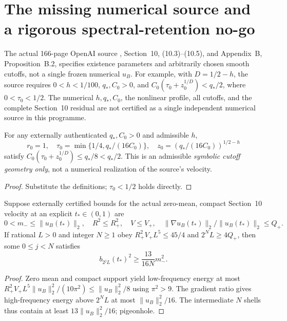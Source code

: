 
\section{The missing numerical source and a rigorous spectral-retention no-go}
\label{sec:xxxii-source-retention}
The actual 166-page OpenAI source \cite{openai2026}, Section~10,
(10.3)--(10.5), and Appendix~B, Proposition~B.2, specifies
existence parameters and arbitrarily chosen smooth cutoffs,
not a single frozen numerical $u_B$. For example, with
$D=1/2-h$, the source requires
$0<h<1/100$, $q_*,C_0>0$, and
$C_0(\tau_0+z_0^{1/D})<q_*/2$, where $0<\tau_0<1/2$.
The numerical $h,q_*,C_0$, the nonlinear profile, all cutoffs,
and the complete Section~10 residual are not certified as a
single independent numerical source in this programme.

\begin{proposition}
For any externally authenticated $q_*,C_0>0$ and admissible $h$,
\[
r_0=1,\quad \tau_0=\min\{1/4,q_*/(16C_0)\},\quad
z_0=(q_*/(16C_0))^{1/2-h}
\]
satisfy $C_0(\tau_0+z_0^{1/D})\le q_*/8<q_*/2$.
This is an admissible \emph{symbolic cutoff geometry only},
not a numerical realization of the source's velocity.
\end{proposition}
\begin{proof} Substitute the definitions; $\tau_0<1/2$
holds directly. \end{proof}

\begin{proposition}
\label{prop:xxxii-interval}
Suppose externally certified bounds for the actual zero-mean,
compact Section~10 velocity at an explicit $t_*\in(0,1)$ are
\[
0<m_-\le\|u_B(t_*)\|_2,\quad
R^2\le R_+^2,\quad V\le V_+,\quad
\|\nabla u_B(t_*)\|_2/\|u_B(t_*)\|_2\le Q_+.
\]
If rational $L>0$ and integer $N\ge1$ obey
$R_+^2V_+L^5\le45/4$ and $2^NL\ge4Q_+$,
then some $0\le j<N$ satisfies
\[
\boxed{\quad b_{2^jL}(t_*)^2\ge
\frac{13}{16N}m_-^2.\quad}
\]
\end{proposition}
\begin{proof}
Zero mean and compact support yield low-frequency
energy at most $R_+^2V_+L^5\|u_B\|_2^2/(10\pi^2)
\le\|u_B\|_2^2/8$ using $\pi^2>9$.
The gradient ratio gives high-frequency energy above
$2^NL$ at most $\|u_B\|_2^2/16$.
The intermediate $N$ shells thus contain at least
$13\|u_B\|_2^2/16$; pigeonhole.
\end{proof}


